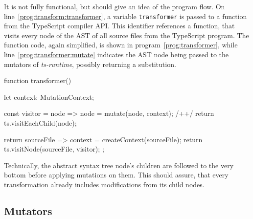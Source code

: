 It is not fully functional, but should give an idea of the program flow. On line~\ref{prog:transform:transformer}, a variable \texttt{transformer} is passed to a function from the TypeScript compiler API. This identifier references a function, that visits every node of the AST of all source files from the TypeScript program. The function code, again simplified, is shown in program~\ref{prog:transformer}, while line~\ref{prog:transformer:mutate} indicates the AST node being passed to the mutators of \emph{ts-runtime}, possibly returning a substitution.
\begin{program}
\caption{}
\label{prog:transformer}
\begin{JsCode}
function transformer() {
  let context: MutationContext;
  
  const visitor = node => {
    node = mutate(node, context); /+\label{prog:transformer:mutate}+/
    return ts.visitEachChild(node);
  }
  
  return sourceFile => {
    context = createContext(sourceFile);
    return ts.visitNode(sourceFile, visitor);
  };
}
\end{JsCode}
\end{program}
Technically, the abstract syntax tree node's children are followed to the very bottom before applying mutations on them. This should assure, that every transformation already includes modifications from its child nodes.


\subsection{Mutators}
\label{sec:mutators}

